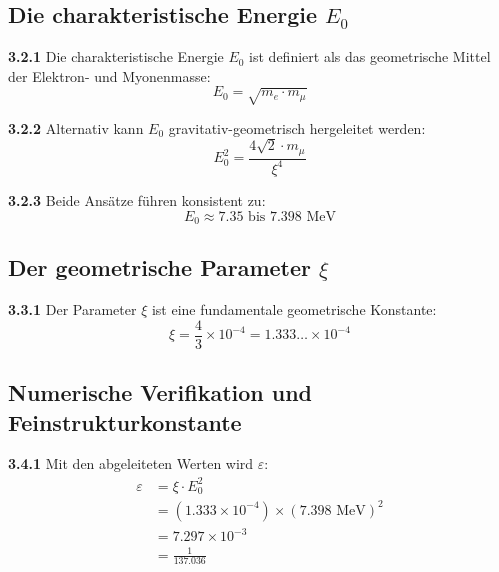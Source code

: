 \documentclass[12pt,a4paper]{article}
\newcommand{\Ezero}{E_0}
\newcommand{\xipar}{\xi}
\begin{document}
	\subsection{Die charakteristische Energie $\Ezero$}
	
	\noindent \textbf{3.2.1} Die charakteristische Energie $\Ezero$ ist definiert als das geometrische Mittel der Elektron- und Myonenmasse:
	\begin{equation}
		\Ezero = \sqrt{m_e \cdot m_\mu}
		\label{eq:E0_geometric_mean}
	\end{equation}
	
	\noindent \textbf{3.2.2} Alternativ kann $\Ezero$ gravitativ-geometrisch hergeleitet werden:
	\begin{equation}
		\Ezero^2 = \frac{4\sqrt{2} \cdot m_\mu}{\xipar^4}
		\label{eq:E0_gravitational}
	\end{equation}
	
	\noindent \textbf{3.2.3} Beide Ansätze führen konsistent zu:
	\begin{equation}
		\Ezero \approx 7.35 \text{ bis } 7.398 \text{ MeV}
	\end{equation}
	
	\subsection{Der geometrische Parameter $\xipar$}
	
	\noindent \textbf{3.3.1} Der Parameter $\xipar$ ist eine fundamentale geometrische Konstante:
	\begin{equation}
		\xipar = \frac{4}{3} \times 10^{-4} = 1.333\ldots \times 10^{-4}
		\label{eq:xi_value}
	\end{equation}
	
	\subsection{Numerische Verifikation und Feinstrukturkonstante}
	
	\noindent \textbf{3.4.1} Mit den abgeleiteten Werten wird $\varepsilon$:
	\begin{align}
		\varepsilon &= \xipar \cdot \Ezero^2 \\
		&= (1.333 \times 10^{-4}) \times (7.398 \text{ MeV})^2 \\
		&= 7.297 \times 10^{-3} \\
		&= \frac{1}{137.036}
		\label{eq:epsilon_numerical}
	\end{align}
	
\end{document}

